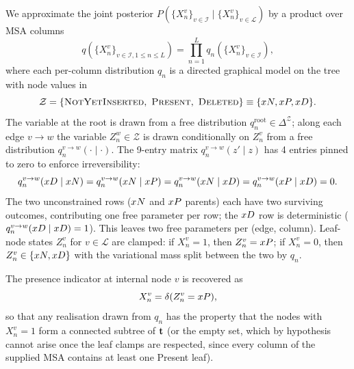 We approximate the joint posterior
$P(\{X^v_n\}_{v \in \mathcal{I}} \mid \{X^v_n\}_{v \in \mathcal{L}})$
by a product over MSA columns
\begin{equation}
\label{eq:q-factor}
q(\{X^v_n\}_{v \in \mathcal{I}, 1 \le n \le L})
= \prod_{n=1}^{L} q_n(\{X^v_n\}_{v \in \mathcal{I}}),
\end{equation}
where each per-column distribution $q_n$ is a directed graphical
model on the tree with node values in
\begin{equation}
\label{eq:Z-states}
\mathcal{Z} = \{\textsc{NotYetInserted},\ \textsc{Present},\ \textsc{Deleted}\}
\equiv \{\state{N}, \state{P}, \state{D}\}.
\end{equation}
The variable at the root is drawn from a free distribution
$q_n^{\text{root}} \in \Delta^{\mathcal{Z}}$;
along each edge $v \to w$ the variable $Z^w_n \in \mathcal{Z}$ is
drawn conditionally on $Z^v_n$ from a free distribution
$q_n^{v \to w}(\cdot \mid \cdot)$.
The 9-entry matrix $q_n^{v \to w}(z' \mid z)$ has 4 entries pinned to
zero to enforce irreversibility:
\begin{equation}
\label{eq:irreversibility}
q_n^{v \to w}(x{D} \mid x{N}) =
q_n^{v \to w}(x{N} \mid x{P}) =
q_n^{v \to w}(x{N} \mid x{D}) =
q_n^{v \to w}(x{P} \mid x{D}) = 0.
\end{equation}
The two unconstrained rows ($x{N}$ and $x{P}$ parents) each
have two surviving outcomes, contributing one free parameter per row;
the $x{D}$ row is deterministic
($q_n^{v \to w}(x{D} \mid x{D}) = 1$).
This leaves two free parameters per (edge, column).
Leaf-node states $Z^v_n$ for $v \in \mathcal{L}$ are clamped: if
$X^v_n = 1$, then $Z^v_n = x{P}$; if $X^v_n = 0$, then
$Z^v_n \in \{x{N}, x{D}\}$ with the variational mass split
between the two by $q_n$.

The presence indicator at internal node $v$ is recovered as
\begin{equation}
\label{eq:Z-to-X}
X^v_n = \delta(Z^v_n = x{P}),
\end{equation}
so that any realisation drawn from $q_n$ has the property that the
nodes with $X^v_n = 1$ form a connected subtree of $\mathbf{t}$
(or the empty set, which by hypothesis cannot arise once the leaf
clamps are respected, since every column of the supplied MSA contains
at least one Present leaf).


